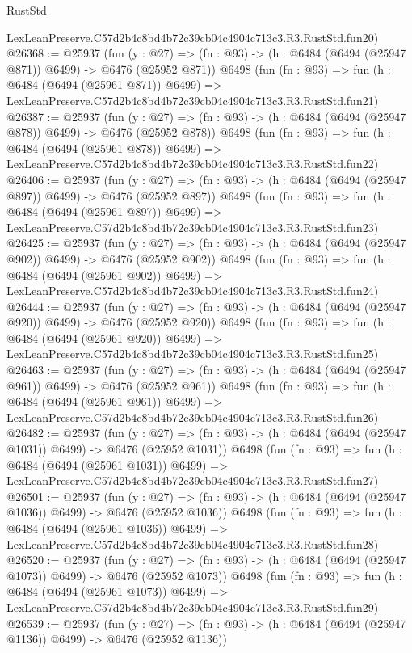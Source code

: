 \begin{lexlean}{RustStd}
\begin{coremodule}
    LexLeanPreserve.C57d2b4c8bd4b72c39cb04c4904c713c3.R3.RustStd.fun20)
@26368 := @25937
    (fun (y : @27) => (fn : @93) -> (h : @6484 (@6494 (@25947 @871)) @6499) -> @6476 (@25952 @871))
    @6498
    (fun (fn : @93) =>
    fun (h : @6484 (@6494 (@25961 @871)) @6499) =>
    LexLeanPreserve.C57d2b4c8bd4b72c39cb04c4904c713c3.R3.RustStd.fun21)
@26387 := @25937
    (fun (y : @27) => (fn : @93) -> (h : @6484 (@6494 (@25947 @878)) @6499) -> @6476 (@25952 @878))
    @6498
    (fun (fn : @93) =>
    fun (h : @6484 (@6494 (@25961 @878)) @6499) =>
    LexLeanPreserve.C57d2b4c8bd4b72c39cb04c4904c713c3.R3.RustStd.fun22)
@26406 := @25937
    (fun (y : @27) => (fn : @93) -> (h : @6484 (@6494 (@25947 @897)) @6499) -> @6476 (@25952 @897))
    @6498
    (fun (fn : @93) =>
    fun (h : @6484 (@6494 (@25961 @897)) @6499) =>
    LexLeanPreserve.C57d2b4c8bd4b72c39cb04c4904c713c3.R3.RustStd.fun23)
@26425 := @25937
    (fun (y : @27) => (fn : @93) -> (h : @6484 (@6494 (@25947 @902)) @6499) -> @6476 (@25952 @902))
    @6498
    (fun (fn : @93) =>
    fun (h : @6484 (@6494 (@25961 @902)) @6499) =>
    LexLeanPreserve.C57d2b4c8bd4b72c39cb04c4904c713c3.R3.RustStd.fun24)
@26444 := @25937
    (fun (y : @27) => (fn : @93) -> (h : @6484 (@6494 (@25947 @920)) @6499) -> @6476 (@25952 @920))
    @6498
    (fun (fn : @93) =>
    fun (h : @6484 (@6494 (@25961 @920)) @6499) =>
    LexLeanPreserve.C57d2b4c8bd4b72c39cb04c4904c713c3.R3.RustStd.fun25)
@26463 := @25937
    (fun (y : @27) => (fn : @93) -> (h : @6484 (@6494 (@25947 @961)) @6499) -> @6476 (@25952 @961))
    @6498
    (fun (fn : @93) =>
    fun (h : @6484 (@6494 (@25961 @961)) @6499) =>
    LexLeanPreserve.C57d2b4c8bd4b72c39cb04c4904c713c3.R3.RustStd.fun26)
@26482 := @25937
    (fun (y : @27) =>
    (fn : @93) -> (h : @6484 (@6494 (@25947 @1031)) @6499) -> @6476 (@25952 @1031))
    @6498
    (fun (fn : @93) =>
    fun (h : @6484 (@6494 (@25961 @1031)) @6499) =>
    LexLeanPreserve.C57d2b4c8bd4b72c39cb04c4904c713c3.R3.RustStd.fun27)
@26501 := @25937
    (fun (y : @27) =>
    (fn : @93) -> (h : @6484 (@6494 (@25947 @1036)) @6499) -> @6476 (@25952 @1036))
    @6498
    (fun (fn : @93) =>
    fun (h : @6484 (@6494 (@25961 @1036)) @6499) =>
    LexLeanPreserve.C57d2b4c8bd4b72c39cb04c4904c713c3.R3.RustStd.fun28)
@26520 := @25937
    (fun (y : @27) =>
    (fn : @93) -> (h : @6484 (@6494 (@25947 @1073)) @6499) -> @6476 (@25952 @1073))
    @6498
    (fun (fn : @93) =>
    fun (h : @6484 (@6494 (@25961 @1073)) @6499) =>
    LexLeanPreserve.C57d2b4c8bd4b72c39cb04c4904c713c3.R3.RustStd.fun29)
@26539 := @25937
    (fun (y : @27) =>
    (fn : @93) -> (h : @6484 (@6494 (@25947 @1136)) @6499) -> @6476 (@25952 @1136))

\end{coremodule}
\end{lexlean}
